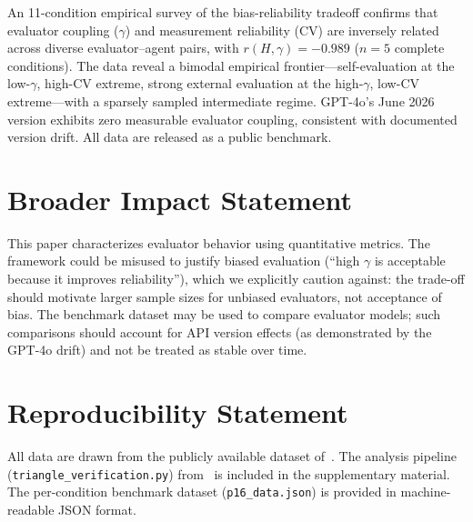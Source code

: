 \documentclass[11pt]{article}
\begin{document}
An 11-condition empirical survey of the bias-reliability tradeoff confirms that evaluator coupling ($\gamma$) and measurement reliability (CV) are inversely related across diverse evaluator--agent pairs, with $r(H, \gamma) = -0.989$ ($n = 5$ complete conditions). The data reveal a bimodal empirical frontier---self-evaluation at the low-$\gamma$, high-CV extreme, strong external evaluation at the high-$\gamma$, low-CV extreme---with a sparsely sampled intermediate regime. GPT-4o's June 2026 version exhibits zero measurable evaluator coupling, consistent with documented version drift. All data are released as a public benchmark.

\section*{Broader Impact Statement}

This paper characterizes evaluator behavior using quantitative metrics. The framework could be misused to justify biased evaluation (``high $\gamma$ is acceptable because it improves reliability''), which we explicitly caution against: the trade-off should motivate larger sample sizes for unbiased evaluators, not acceptance of bias. The benchmark dataset may be used to compare evaluator models; such comparisons should account for API version effects (as demonstrated by the GPT-4o drift) and not be treated as stable over time.

\section*{Reproducibility Statement}

All data are drawn from the publicly available dataset of~\cite{liu2026mmepc}. The analysis pipeline (\texttt{triangle\_verification.py}) from~\cite{liu2026triangle} is included in the supplementary material. The per-condition benchmark dataset (\texttt{p16\_data.json}) is provided in machine-readable JSON format.
\end{document}
